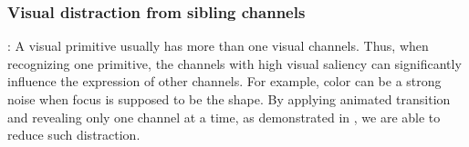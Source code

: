 \subsubsection{Visual distraction from sibling channels}: A visual primitive usually has more than one visual channels. Thus, when recognizing one primitive, the channels with high visual saliency can significantly influence the expression of other channels. For example, color can be a strong noise when focus is supposed to be the shape. By applying animated transition and revealing only one channel at a time, as demonstrated in , we are able to reduce such distraction.


